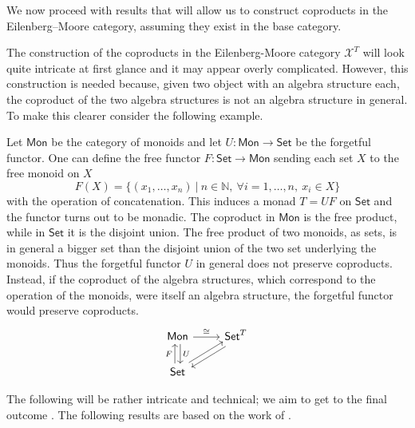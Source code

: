 We now proceed with results that will allow us to construct coproducts in the Eilenberg–Moore category, assuming they exist in the base category.

The construction of the coproducts in the Eilenberg-Moore category $\mathcal{X}^T$ will look quite intricate at first glance and it may appear overly complicated. However, this construction is needed because, given two object with an algebra structure each, the coproduct of the two algebra structures is not an algebra structure in general. To make this clearer consider the following example.

\begin{rembox}{}
    \begin{ex}
        Let $\mathsf{Mon}$ be the category of monoids and let $U: \mathsf{Mon} \to \mathsf{Set}$ be the forgetful functor. One can define the free functor $F: \mathsf{Set} \to \mathsf{Mon}$ sending each set $X$ to the free monoid on $X$
        \[F(X) = \{(x_1,\ldots,x_n) \ | \ n \in \mathbb{N}, \ \forall i=1,\ldots,n, \ x_i \in X \}\]
        with the operation of concatenation. This induces a monad $T=UF$ on $\mathsf{Set}$ and the functor turns out to be monadic. The coproduct in $\mathsf{Mon}$ is the free product, while in $\mathsf{Set}$ it is the disjoint union. The free product of two monoids, as sets, is in general a bigger set than the disjoint union of the two set underlying the monoids. Thus the forgetful functor $U$ in general does not preserve coproducts. Instead, if the coproduct of the algebra structures, which correspond to the operation of the monoids, were itself an algebra structure, the forgetful functor would preserve coproducts.
        \[
\begin{tikzcd}
\mathsf{Mon} \arrow[r, "\cong"] \arrow[d, "U", shift left]     & \mathsf{Set}^T \arrow[ld, shift left] \\
\mathsf{Set} \arrow[u, "F", shift left] \arrow[ru, shift left] &                                      
\end{tikzcd}
        \]
    \end{ex}
\end{rembox}

The following will be rather intricate and technical; we aim to get to the final outcome . The following results are based on the work of \cite{Linton1969}.

